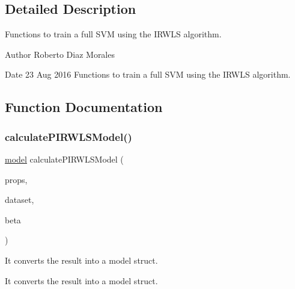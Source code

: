 \subsection{Detailed Description}
Functions to train a full S\+VM using the I\+R\+W\+LS algorithm. 

\begin{DoxyAuthor}{Author}
Roberto Diaz Morales 
\end{DoxyAuthor}
\begin{DoxyDate}{Date}
23 Aug 2016 Functions to train a full S\+VM using the I\+R\+W\+LS algorithm. 
\end{DoxyDate}


\subsection{Function Documentation}
\hypertarget{PIRWLS-train_8h_aeaa2f3c1d0f757826017dae7a83d7f8a}{}\label{PIRWLS-train_8h_aeaa2f3c1d0f757826017dae7a83d7f8a} 
\subsubsection{\texorpdfstring{calculate\+P\+I\+R\+W\+L\+S\+Model()}{calculatePIRWLSModel()}}
{\ttfamily \hyperlink{structmodel}{model} calculate\+P\+I\+R\+W\+L\+S\+Model (\begin{DoxyParamCaption}\item[{\hyperlink{structproperties}{properties}}]{props,  }\item[{\hyperlink{structsvm__dataset}{svm\+\_\+dataset}}]{dataset,  }\item[{double $\ast$}]{beta }\end{DoxyParamCaption})}



It converts the result into a model struct. 

It converts the result into a model struct. \hypertarget{PIRWLS-train_8h_a661bbe4aa2899bb306b7b509296068a2}{}\label{PIRWLS-train_8h_a661bbe4aa2899bb306b7b509296068a2} 

